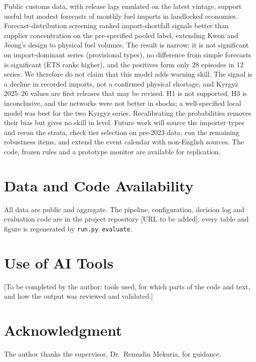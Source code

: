 \documentclass[conference]{IEEEtran}
\begin{document}
Public customs data, with release lags emulated on the latest vintage, support useful but modest forecasts of monthly fuel imports in landlocked economies. Forecast-distribution screening ranked import-shortfall signals better than supplier concentration on the pre-specified pooled label, extending Kwon and Jeong's design to physical fuel volumes. The result is narrow: it is not significant on import-dominant series (provisional types), no difference from simple forecasts is significant (ETS ranks higher), and the positives form only 28 episodes in 12 series. We therefore do not claim that this model adds warning skill. The signal is a decline in recorded imports, not a confirmed physical shortage, and Kyrgyz 2025--26 values are first releases that may be revised. H1 is not supported, H3 is inconclusive, and the networks were not better in shocks; a well-specified local model was best for the two Kyrgyz series. Recalibrating the probabilities removes their bias but gives no skill in level. Future work will source the importer types and rerun the strata, check tier selection on pre-2023 data, run the remaining robustness items, and extend the event calendar with non-English sources. The code, frozen rules and a prototype monitor are available for replication.

\section*{Data and Code Availability}
All data are public and aggregate. The pipeline, configuration, decision log and evaluation code are in the project repository [URL to be added]; every table and figure is regenerated by \texttt{run.py evaluate}.

\section*{Use of AI Tools}
[To be completed by the author: tools used, for which parts of the code and text, and how the output was reviewed and validated.]

\section*{Acknowledgment}
The author thanks the supervisor, Dr.\ Remudin Mekuria, for guidance.



\end{document}
